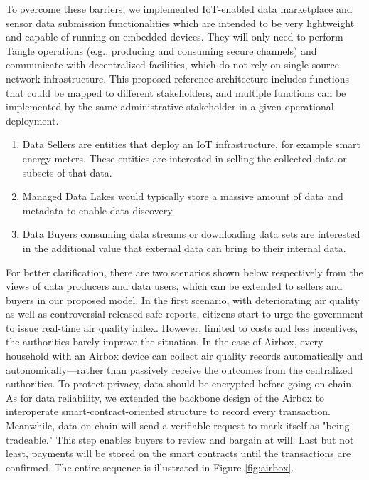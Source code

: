 \documentclass[journal,article,applsci,submit,moreauthors,pdftex]{Definitions/mdpi}
\begin{document}
To overcome these barriers, we implemented IoT-enabled data marketplace and sensor data submission functionalities which are intended to be very lightweight and capable of running on embedded devices. They will only need to perform Tangle operations (e.g., producing and consuming secure channels) and communicate with decentralized facilities, which do not rely on single-source network infrastructure. This proposed reference architecture includes functions that could be mapped to different stakeholders, and multiple functions can be implemented by the same administrative stakeholder in a given operational deployment.
\begin{enumerate}[leftmargin=*,labelsep=4.9mm]
    \item Data Sellers are entities that deploy an IoT infrastructure, for example smart energy meters. These entities are interested in selling the collected data or subsets of that data.
    \item Managed Data Lakes would typically store a massive amount of data and metadata to enable data discovery.
    \item Data Buyers consuming data streams or downloading data sets are interested in the additional value that external data can bring to their internal data.
\end{enumerate}

For better clarification, there are two scenarios shown below respectively from the views of data producers and data users, which can be extended to sellers and buyers in our proposed model. In the first scenario, with deteriorating air quality as well as controversial released safe reports, citizens start to urge the government to issue real-time air quality index. However, limited to costs and less incentives, the authorities barely improve the situation. In the case of Airbox\cite{LASS}, every household with an Airbox device can collect air quality records automatically and autonomically—rather than passively receive the outcomes from the centralized authorities. To protect privacy, data should be encrypted before going on-chain. As for data reliability, we extended the backbone design of the Airbox to interoperate smart-contract-oriented structure to record every transaction. Meanwhile, data on-chain will send a verifiable request to mark itself as "being tradeable." This step enables buyers to review and bargain at will. Last but not least, payments will be stored on the smart contracts until the transactions are confirmed. The entire sequence is illustrated in Figure \ref{fig:airbox}.
\end{document}
